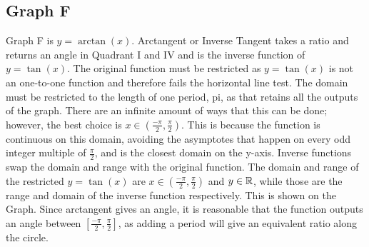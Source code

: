 \subsection{Graph F}

Graph F is ${y=\arctan(x)}$.
Arctangent or Inverse Tangent takes a ratio and returns an angle in Quadrant I and IV and is the inverse function of ${y=\tan(x)}$.
The original function must be restricted as ${y=\tan(x)}$ is not an one-to-one function and therefore fails the horizontal line test.
The domain must be restricted to the length of one period, pi, as that retains all the outputs of the graph.
There are an infinite amount of ways that this can be done; however, the best choice is ${x \in {(\frac{-\pi}{2}, \frac{\pi}{2})}}$.
This is because the function is continuous on this domain, avoiding the asymptotes that happen on every odd integer multiple of ${\frac{\pi}{2}}$, and is the closest domain on the y-axis.
Inverse functions swap the domain and range with the original function.
The domain and range of the restricted ${y=\tan(x)}$ are ${x \in {(\frac{-\pi}{2}, \frac{\pi}{2})}}$ and ${y \in \mathbb{R}}$, while those are the range and domain of the inverse function respectively.
This is shown on the Graph.
Since arctangent gives an angle, it is reasonable that the function outputs an angle between ${[\frac{-\pi}{2}, \frac{\pi}{2}]}$, as adding a period will give an equivalent ratio along the circle.
